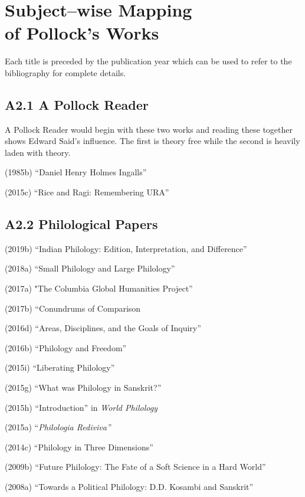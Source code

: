 
\chapter{Subject–wise Mapping\\ of Pollock’s Works}\label{Anubandha2}

Each title is preceded by the publication year which can be used to refer to the bibliography for complete details.

\vspace{-.4cm}

\section*{A2.1 A Pollock Reader}

A Pollock Reader would begin with these two works and reading these together shows Edward Said’s influence. The first is theory free while the second is heavily laden with theory.

(1985b) “Daniel Henry Holmes Ingalls”

(2015c) “Rice and Ragi: Remembering URA”

\vspace{-.4cm}

\section*{A2.2 Philological Papers}

(2019b) “Indian Philology: Edition, Interpretation, and Difference”

(2018a) “Small Philology and Large Philology”

(2017a) "The Columbia Global Humanities Project”

(2017b) “Conundrums of Comparison

(2016d) “Areas, Disciplines, and the Goals of Inquiry”

(2016b) “Philology and Freedom”

(2015i) “Liberating Philology”

(2015g) “What was Philology in Sanskrit?”

(2015h) “Introduction” in \textit{World Philology}

(2015a) “\textit{Philologia Rediviva”}

(2014c) “Philology in Three Dimensions”

(2009b) “Future Philology: The Fate of a Soft Science in a Hard World”

(2008a) “Towards a Political Philology: D.D. Kosambi and Sanskrit”

